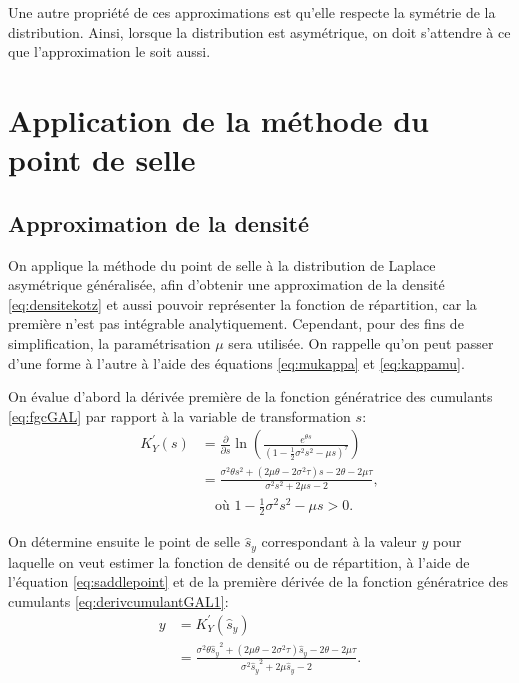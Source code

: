 Une autre propriété de ces approximations est qu'elle respecte la
symétrie de la distribution. Ainsi, lorsque la distribution est
asymétrique, on doit s'attendre à ce que l'approximation le soit
aussi.

\section{Application de la méthode du point de selle}

\subsection{Approximation de la densité}
\label{sec:applicationsaddleGAL}

On applique la méthode du point de selle à la distribution de Laplace
asymétrique généralisée, afin d'obtenir une approximation de la
densité \eqref{eq:densitekotz} et aussi pouvoir représenter la
fonction de répartition, car la première n'est pas intégrable
analytiquement. Cependant, pour des fins de simplification, la
paramétrisation $\mu$ sera utilisée. On rappelle qu'on peut passer
d'une forme à l'autre à l'aide des équations \eqref{eq:mukappa} et
\eqref{eq:kappamu}.

On évalue d'abord la dérivée première de la fonction génératrice des
cumulants \eqref{eq:fgcGAL} par rapport à la variable de
transformation $s$:
\begin{align}
  \label{eq:derivcumulantGAL1}
  K^{\prime}_Y({s}) &=
  \frac{\partial}{\partial{s}}\ln\left(\frac{e^{\theta
        {s}}}{\left(1-\frac{1}{2} \sigma^2 {s}^2 - \mu {s}
      \right)^{\tau}}\right) \nonumber\\
  &= \frac{{\sigma}^{2}\theta{{s}}^{2}+\left(
      2\mu\theta-2{\sigma}^{2}\tau\right)
    {s}-2\theta-2\mu\tau}{{\sigma}^{2}{{s}}^{2}+2\mu{s}-2}, \\ & \quad
  \mbox{où } 1-\frac{1}{2} \sigma^2 {s}^2 - \mu {s} > 0.
\end{align}

On détermine ensuite le point de selle $\hat{s}_y$ correspondant à la
valeur $y$ pour laquelle on veut estimer la fonction de densité ou de
répartition, à l'aide de l'équation \eqref{eq:saddlepoint} et de la
première dérivée de la fonction génératrice des cumulants
\eqref{eq:derivcumulantGAL1}:
\begin{align*}
  y &= K^{\prime}_Y({\hat{s}_y}) \\
  &= \frac{{\sigma}^{2}\theta{\hat{s}_y}^{2}+\left(
      2\mu\theta-2{\sigma}^{2}\tau\right)
    {\hat{s}_y}-2\theta-2\mu\tau}{{\sigma}^{2}{{\hat{s}_y}}^{2}+2\mu{\hat{s}_y}-2}.
\end{align*}

